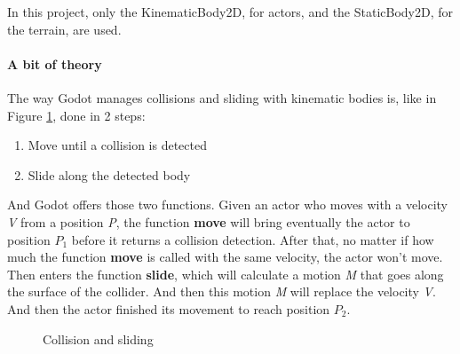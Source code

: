 \documentclass[10pt,a4paper]{article}
\begin{document}
In this project, only the KinematicBody2D, for actors, and the StaticBody2D, for the terrain, are used.

\paragraph{A bit of theory}
The way Godot manages collisions and sliding with kinematic bodies is, like in Figure \ref{fig:collision_sliding}, done in 2 steps:
\begin{enumerate}
\item Move until a collision is detected
\item Slide along the detected body
\end{enumerate}
And Godot offers those two functions. Given an actor who moves with a velocity \textit{V} from a position \textit{P}, the function \textbf{move} will bring eventually the actor to position \textit{$P_1$} before it returns a collision detection. After that, no matter if how much the function \textbf{move} is called with the same velocity, the actor won't move. Then enters the function \textbf{slide}, which will calculate a motion \textit{M} that goes along the surface of the collider. And then this motion \textit{M} will replace the velocity \textit{V}. And then the actor finished its movement to reach position \textit{$P_2$}.
\begin{figure}[h]
\centering
{}
\caption{Collision and sliding}
\label{fig:collision_sliding}
\end{figure}
\end{document}
